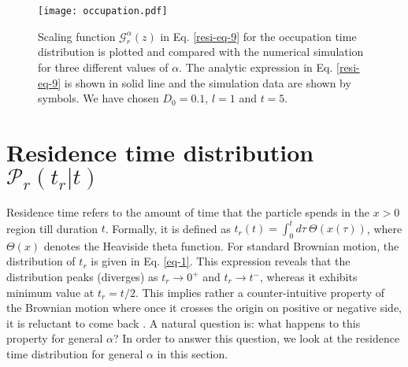 \documentclass[showpacs,amsmath,amssymb,aps,pre,twocolumn,]{revtex4-1}
\def\bluew#1{{\color{black} #1}}
\begin{document}
\begin{figure}[t]
\texttt{[image: occupation.pdf]}
\centering
\caption{Scaling function $\mathcal{G}_{r}^{\alpha}(z)$ in Eq. \eqref{resi-eq-9} for the occupation time distribution is plotted and compared with the numerical simulation for three different values of $\alpha$. The analytic expression in Eq. \eqref{resi-eq-9} is shown in solid line and the simulation data are shown by symbols. We have chosen $D_0=0.1$, $l=1$ and $t=5$. }
\label{occupation-fig}
\end{figure}
\section{Residence time distribution $\mathcal{P}_r(t_r|t)$}
\label{residence-time}
Residence time refers to the amount of time that the particle spends in the $x > 0$ region till duration $t$. Formally, it is defined as $t_r(t) = \int _{0}^{t} d\tau ~\Theta \left( x(\tau) \right)$, where $\Theta (x)$ denotes the Heaviside theta function. For standard Brownian motion, the distribution of $t_r$ is given in Eq. \eqref{eq-1}. This expression reveals that the distribution peaks (diverges) as $t_{r} \to  0^+$ and $t_{r} \to t^-$, whereas it exhibits minimum value at $t_r = t/2$. This implies rather a counter-intuitive property of the Brownian motion where once it crosses the origin on positive or negative side, it is reluctant to come back \bluew{\cite{Majumdar005}}. A natural question is: what happens to this property for general $\alpha$? In order to answer this question, we look at the residence time distribution for general $\alpha$ in this section.
\end{document}
